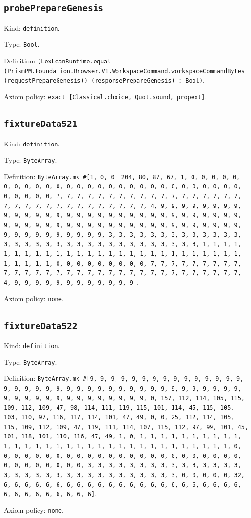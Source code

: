 \documentclass[11pt]{article}
\begin{document}
\subsection*{\texttt{probePrepareGenesis}}
\noindent Kind: \texttt{definition}.\par
\noindent Type: \texttt{Bool}.\par
\noindent Definition: \texttt{(LexLeanRuntime.equal (PrismPM.Foundation.Browser.V1.WorkspaceCommand.workspaceCommandBytes (requestPrepareGenesis)) (responsePrepareGenesis) : Bool)}.\par
\noindent Axiom policy: \texttt{exact [Classical.choice, Quot.sound, propext]}.\par
\subsection*{\texttt{fixtureData521}}
\noindent Kind: \texttt{definition}.\par
\noindent Type: \texttt{ByteArray}.\par
\noindent Definition: \texttt{ByteArray.mk \#[1, 0, 0, 204, 80, 87, 67, 1, 0, 0, 0, 0, 0, 0, 0, 0, 0, 0, 0, 0, 0, 0, 0, 0, 0, 0, 0, 0, 0, 0, 0, 0, 0, 0, 0, 0, 0, 0, 0, 0, 0, 7, 7, 7, 7, 7, 7, 7, 7, 7, 7, 7, 7, 7, 7, 7, 7, 7, 7, 7, 7, 7, 7, 7, 7, 7, 7, 7, 7, 7, 7, 7, 7, 4, 9, 9, 9, 9, 9, 9, 9, 9, 9, 9, 9, 9, 9, 9, 9, 9, 9, 9, 9, 9, 9, 9, 9, 9, 9, 9, 9, 9, 9, 9, 9, 9, 9, 9, 9, 9, 9, 9, 9, 9, 9, 9, 9, 9, 9, 9, 9, 9, 9, 9, 9, 9, 9, 9, 9, 9, 9, 9, 9, 9, 9, 9, 9, 9, 3, 3, 3, 3, 3, 3, 3, 3, 3, 3, 3, 3, 3, 3, 3, 3, 3, 3, 3, 3, 3, 3, 3, 3, 3, 3, 3, 3, 3, 3, 3, 3, 1, 1, 1, 1, 1, 1, 1, 1, 1, 1, 1, 1, 1, 1, 1, 1, 1, 1, 1, 1, 1, 1, 1, 1, 1, 1, 1, 1, 1, 1, 1, 1, 0, 0, 0, 0, 0, 0, 0, 0, 0, 7, 7, 7, 7, 7, 7, 7, 7, 7, 7, 7, 7, 7, 7, 7, 7, 7, 7, 7, 7, 7, 7, 7, 7, 7, 7, 7, 7, 7, 7, 7, 7, 4, 9, 9, 9, 9, 9, 9, 9, 9, 9, 9, 9, 9]}.\par
\noindent Axiom policy: \texttt{none}.\par
\subsection*{\texttt{fixtureData522}}
\noindent Kind: \texttt{definition}.\par
\noindent Type: \texttt{ByteArray}.\par
\noindent Definition: \texttt{ByteArray.mk \#[9, 9, 9, 9, 9, 9, 9, 9, 9, 9, 9, 9, 9, 9, 9, 9, 9, 9, 9, 9, 9, 9, 9, 9, 9, 9, 9, 9, 9, 9, 9, 9, 9, 9, 9, 9, 9, 9, 9, 9, 9, 9, 9, 9, 9, 9, 9, 9, 9, 9, 9, 9, 0, 157, 112, 114, 105, 115, 109, 112, 109, 47, 98, 114, 111, 119, 115, 101, 114, 45, 115, 105, 103, 110, 97, 116, 117, 114, 101, 47, 49, 0, 0, 25, 112, 114, 105, 115, 109, 112, 109, 47, 119, 111, 114, 107, 115, 112, 97, 99, 101, 45, 101, 118, 101, 110, 116, 47, 49, 1, 0, 1, 1, 1, 1, 1, 1, 1, 1, 1, 1, 1, 1, 1, 1, 1, 1, 1, 1, 1, 1, 1, 1, 1, 1, 1, 1, 1, 1, 1, 1, 1, 1, 0, 0, 0, 0, 0, 0, 0, 0, 0, 0, 0, 0, 0, 0, 0, 0, 0, 0, 0, 0, 0, 0, 0, 0, 0, 0, 0, 0, 0, 0, 0, 0, 3, 3, 3, 3, 3, 3, 3, 3, 3, 3, 3, 3, 3, 3, 3, 3, 3, 3, 3, 3, 3, 3, 3, 3, 3, 3, 3, 3, 3, 3, 3, 3, 0, 0, 0, 0, 0, 32, 6, 6, 6, 6, 6, 6, 6, 6, 6, 6, 6, 6, 6, 6, 6, 6, 6, 6, 6, 6, 6, 6, 6, 6, 6, 6, 6, 6, 6, 6, 6, 6]}.\par
\noindent Axiom policy: \texttt{none}.\par
\end{document}
